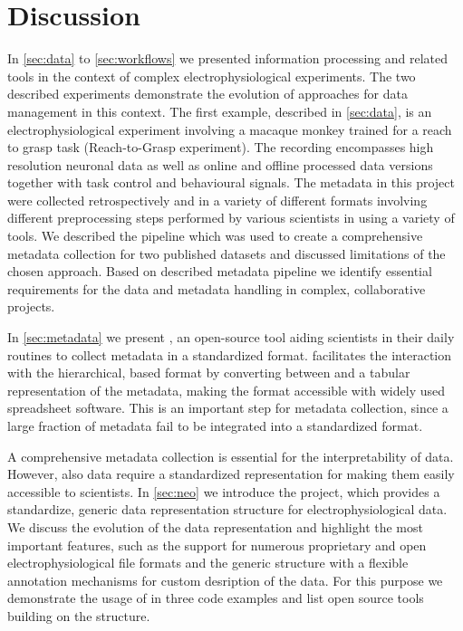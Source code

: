 \clearpage
\chapter{Discussion}
\label{sec:discussion}

In \cref{sec:data} to \cref{sec:workflows} we presented information processing and related tools in the context of complex electrophysiological experiments. The two described experiments demonstrate the evolution of approaches for data management in this context. The first example, described in \cref{sec:data}, is an electrophysiological experiment involving a macaque monkey trained for a reach to grasp task (Reach-to-Grasp experiment). The recording encompasses high resolution neuronal data as well as online and offline processed data versions together with task control and behavioural signals. The metadata in this project were collected retrospectively and in a variety of different formats involving different preprocessing steps performed by various scientists in using a variety of tools. We described the pipeline which was used to create a comprehensive metadata collection for two published datasets and discussed limitations of the chosen approach. Based on described metadata pipeline we identify essential requirements for the data and metadata handling in complex, collaborative projects.

In \cref{sec:metadata} we present , an open-source tool aiding scientists in their daily routines to collect metadata in a standardized format.  facilitates the interaction with the hierarchical,  based  format by converting between  and a tabular representation of the metadata, making the  format accessible with widely used spreadsheet software. This is an important step for metadata collection, since a large fraction of metadata fail to be integrated into a standardized format.

A comprehensive metadata collection is essential for the interpretability of data. However, also data require a standardized representation for making them easily accessible to scientists. In \cref{sec:neo} we introduce the  project, which provides a standardize, generic data representation structure for electrophysiological data. We discuss the evolution of the  data representation and highlight the most important features, such as the support for numerous proprietary and open electrophysiological file formats and the generic structure with a flexible annotation mechanisms for custom desription of the data. For this purpose we demonstrate the usage of  in three code examples and list open source tools building on the  structure.

